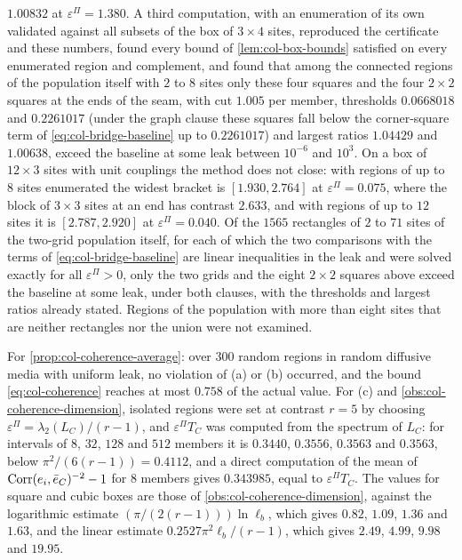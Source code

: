 \begin{numcheck}
$1.00832$ at $\varepsilon^\Pi=1.380$. A third computation, with an enumeration of its own validated against all subsets of the box of $3\times4$ sites, reproduced the certificate and these numbers, found every bound of \cref{lem:col-box-bounds} satisfied on every enumerated region and complement, and found that among the connected regions of the population itself with $2$ to $8$ sites only these four squares and the four $2\times2$ squares at the ends of the seam, with cut $1.005$ per member, thresholds $0.0668018$ and $0.2261017$ (under the graph clause these squares fall below the corner-square term of \eqref{eq:col-bridge-baseline} up to $0.2261017$) and largest ratios $1.04429$ and $1.00638$, exceed the baseline at some leak between $10^{-6}$ and $10^3$. On a box of $12\times3$ sites with unit couplings the method does not close: with regions of up to $8$ sites enumerated the widest bracket is $[1.930,2.764]$ at $\varepsilon^\Pi=0.075$, where the block of $3\times3$ sites at an end has contrast $2.633$, and with regions of up to $12$ sites it is $[2.787,2.920]$ at $\varepsilon^\Pi=0.040$. Of the $1565$ rectangles of $2$ to $71$ sites of the two-grid population itself, for each of which the two comparisons with the terms of \eqref{eq:col-bridge-baseline} are linear inequalities in the leak and were solved exactly for all $\varepsilon^\Pi>0$, only the two grids and the eight $2\times2$ squares above exceed the baseline at some leak, under both clauses, with the thresholds and largest ratios already stated. Regions of the population with more than eight sites that are neither rectangles nor the union were not examined.
\end{numcheck}

\begin{numcheck}\label{chk:col-coherence}
For \cref{prop:col-coherence-average}: over $300$ random regions in random diffusive media with uniform leak, no violation of (a) or (b) occurred, and the bound \eqref{eq:col-coherence} reaches at most $0.758$ of the actual value. For (c) and \cref{obs:col-coherence-dimension}, isolated regions were set at contrast $r=5$ by choosing $\varepsilon^\Pi=\lambda_2(L_C)/(r-1)$, and $\varepsilon^\Pi T_C$ was computed from the spectrum of $L_C$: for intervals of $8$, $32$, $128$ and $512$ members it is $0.3440$, $0.3556$, $0.3563$ and $0.3563$, below $\pi^2/(6(r-1))=0.4112$, and a direct computation of the mean of $\operatorname{Corr}(e_i,\bar e_C)^{-2}-1$ for $8$ members gives $0.343985$, equal to $\varepsilon^\Pi T_C$. The values for square and cubic boxes are those of \cref{obs:col-coherence-dimension}, against the logarithmic estimate $(\pi/(2(r-1)))\ln\ell_b$, which gives $0.82$, $1.09$, $1.36$ and $1.63$, and the linear estimate $0.2527\pi^2\ell_b/(r-1)$, which gives $2.49$, $4.99$, $9.98$ and $19.95$.
\end{numcheck}

